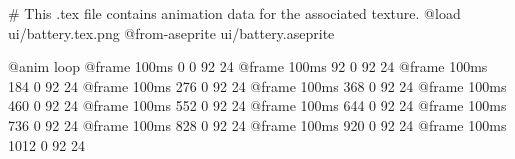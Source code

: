 # This .tex file contains animation data for the associated texture.
@load ui/battery.tex.png
@from-aseprite ui/battery.aseprite

@anim loop
	@frame 100ms 0 0 92 24
	@frame 100ms 92 0 92 24
	@frame 100ms 184 0 92 24
	@frame 100ms 276 0 92 24
	@frame 100ms 368 0 92 24
	@frame 100ms 460 0 92 24
	@frame 100ms 552 0 92 24
	@frame 100ms 644 0 92 24
	@frame 100ms 736 0 92 24
	@frame 100ms 828 0 92 24
	@frame 100ms 920 0 92 24
	@frame 100ms 1012 0 92 24
